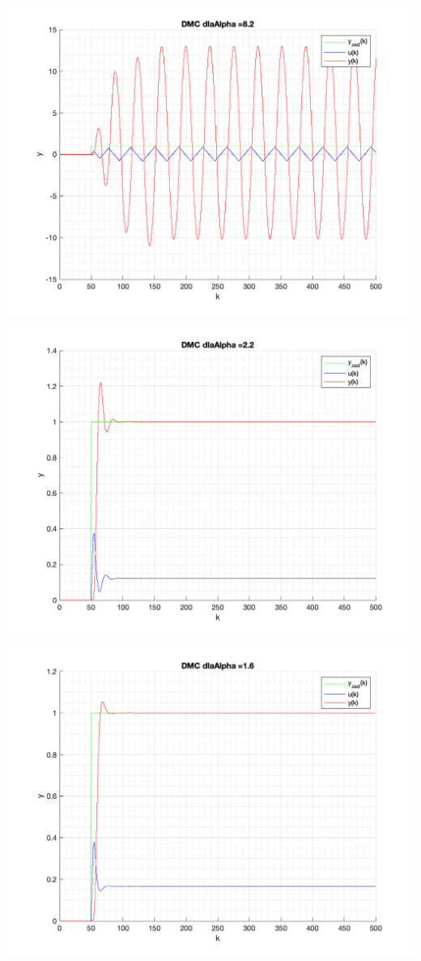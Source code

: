 \documentclass[a4paper, 11pt]{article}
\begin{document}
\begin{enumerate}
 \includegraphics[width=\linewidth]{./ModelsDodatkowe_Alpha/P4_DMC_Alpha_8_2_png.png} 
 
 \includegraphics[width=\linewidth]{./ModelsDodatkowe_Alpha/P4_DMC_Alpha_2_2_png.png} 
 
 \includegraphics[width=\linewidth]{./ModelsDodatkowe_Alpha/P4_DMC_Alpha_1_6_png.png} 
 

\end{enumerate}
\end{document}
